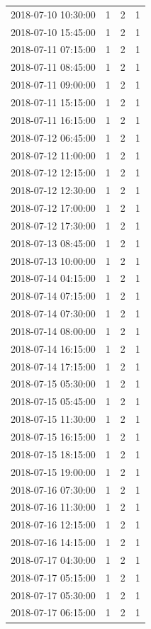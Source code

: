 \begin{tabular}{lrrr}
2018-07-10 10:30:00 & 1 & 2 & 1 \\
2018-07-10 15:45:00 & 1 & 2 & 1 \\
2018-07-11 07:15:00 & 1 & 2 & 1 \\
2018-07-11 08:45:00 & 1 & 2 & 1 \\
2018-07-11 09:00:00 & 1 & 2 & 1 \\
2018-07-11 15:15:00 & 1 & 2 & 1 \\
2018-07-11 16:15:00 & 1 & 2 & 1 \\
2018-07-12 06:45:00 & 1 & 2 & 1 \\
2018-07-12 11:00:00 & 1 & 2 & 1 \\
2018-07-12 12:15:00 & 1 & 2 & 1 \\
2018-07-12 12:30:00 & 1 & 2 & 1 \\
2018-07-12 17:00:00 & 1 & 2 & 1 \\
2018-07-12 17:30:00 & 1 & 2 & 1 \\
2018-07-13 08:45:00 & 1 & 2 & 1 \\
2018-07-13 10:00:00 & 1 & 2 & 1 \\
2018-07-14 04:15:00 & 1 & 2 & 1 \\
2018-07-14 07:15:00 & 1 & 2 & 1 \\
2018-07-14 07:30:00 & 1 & 2 & 1 \\
2018-07-14 08:00:00 & 1 & 2 & 1 \\
2018-07-14 16:15:00 & 1 & 2 & 1 \\
2018-07-14 17:15:00 & 1 & 2 & 1 \\
2018-07-15 05:30:00 & 1 & 2 & 1 \\
2018-07-15 05:45:00 & 1 & 2 & 1 \\
2018-07-15 11:30:00 & 1 & 2 & 1 \\
2018-07-15 16:15:00 & 1 & 2 & 1 \\
2018-07-15 18:15:00 & 1 & 2 & 1 \\
2018-07-15 19:00:00 & 1 & 2 & 1 \\
2018-07-16 07:30:00 & 1 & 2 & 1 \\
2018-07-16 11:30:00 & 1 & 2 & 1 \\
2018-07-16 12:15:00 & 1 & 2 & 1 \\
2018-07-16 14:15:00 & 1 & 2 & 1 \\
2018-07-17 04:30:00 & 1 & 2 & 1 \\
2018-07-17 05:15:00 & 1 & 2 & 1 \\
2018-07-17 05:30:00 & 1 & 2 & 1 \\
2018-07-17 06:15:00 & 1 & 2 & 1 \\

\end{tabular}
